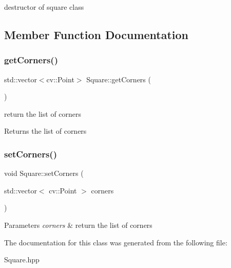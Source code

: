 destructor of square class 

\subsection{Member Function Documentation}
\mbox{\label{class_square_a53b1e1223e97676db711dd75f2daa508}} 
\subsubsection{\texorpdfstring{get\+Corners()}{getCorners()}}
{\footnotesize\ttfamily std\+::vector$<$cv\+::\+Point$>$ Square\+::get\+Corners (\begin{DoxyParamCaption}{ }\end{DoxyParamCaption})}

return the list of corners \begin{DoxyReturn}{Returns}
the list of corners 
\end{DoxyReturn}
\mbox{\label{class_square_a84c4995b49318b5191a4fe3739e4f081}} 
\subsubsection{\texorpdfstring{set\+Corners()}{setCorners()}}
{\footnotesize\ttfamily void Square\+::set\+Corners (\begin{DoxyParamCaption}\item[{std\+::vector$<$ cv\+::\+Point $>$}]{corners }\end{DoxyParamCaption})}


\begin{DoxyParams}{Parameters}
{\em corners} & return the list of corners \\
\hline
\end{DoxyParams}


The documentation for this class was generated from the following file\+:\begin{DoxyCompactItemize}
\item 
Square.\+hpp\end{DoxyCompactItemize}
